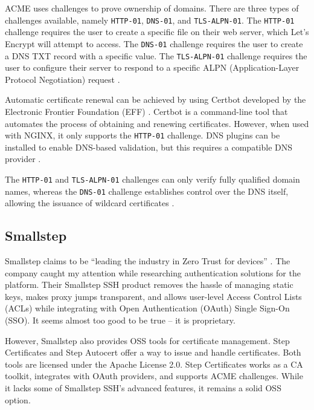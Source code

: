 ACME uses challenges to prove ownership of domains. There are three types of challenges available, namely \texttt{HTTP-01}, \texttt{DNS-01}, and \texttt{TLS-ALPN-01}. The \texttt{HTTP-01} challenge requires the user to create a specific file on their web server, which Let's Encrypt will attempt to access. The \texttt{DNS-01} challenge requires the user to create a DNS TXT record with a specific value. The \texttt{TLS-ALPN-01} challenge requires the user to configure their server to respond to a specific ALPN (Application-Layer Protocol Negotiation) request \Parencite{letsencrypt_challenge_types}.

Automatic certificate renewal can be achieved by using Certbot developed by the Electronic Frontier Foundation (EFF) \parencite{letsencrypt_peter_eckersley}. Certbot is a command-line tool that automates the process of obtaining and renewing certificates. However, when used with NGINX, it only supports the \texttt{HTTP-01} challenge. DNS plugins can be installed to enable DNS-based validation, but this requires a compatible DNS provider \parencite{certbot_plugins}.

The \texttt{HTTP-01} and \texttt{TLS-ALPN-01} challenges can only verify fully qualified domain names, whereas the \texttt{DNS-01} challenge establishes control over the DNS itself, allowing the issuance of wildcard certificates \Parencite{letsencrypt_challenge_types}.

\subsection{Smallstep}
Smallstep claims to be ``leading the industry in Zero Trust for devices'' \parencite{smallstep}. The company caught my attention while researching authentication solutions for the platform. Their Smallstep SSH product removes the hassle of managing static keys, makes proxy jumps transparent, and allows user-level Access Control Lists (ACLs) while integrating with Open Authentication (OAuth) Single Sign-On (SSO). It seems almost too good to be true -- it is proprietary.

However, Smallstep also provides OSS tools for certificate management. Step Certificates \Parencite{smallstep_certificates} and Step Autocert \Parencite{smallstep_autocert} offer a way to issue and handle certificates. Both tools are licensed under the Apache License 2.0. Step Certificates works as a CA toolkit, integrates with OAuth providers, and supports ACME challenges. While it lacks some of Smallstep SSH's advanced features, it remains a solid OSS option.

